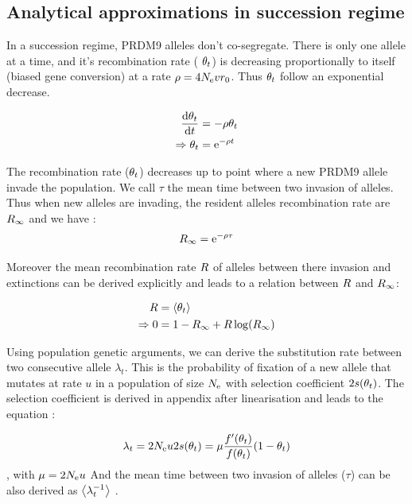 \documentclass{article}
\begin{document}
\subsection*{Analytical approximations in succession regime} 

In a succession regime, PRDM9 alleles don't co-segregate. There is only one allele at a time, and it's recombination rate ( $\theta_{t}$) is decreasing proportionally to itself (biased gene conversion) at a rate $\rho = 4 N_\mathrm{e} v r_0$. Thus $\theta_{t}$ follow an exponential decrease.

\begin{align} 
   \dfrac{\mathrm{d} \theta_{t}}{\mathrm{d} t}  &=  - \rho \theta_{t} \\
        \Rightarrow \theta_{t} &= \operatorname{e}^{-\rho t}
\end{align}

The recombination rate  ($\theta_{t}$) decreases up to point where a new PRDM9 allele invade the population. We call $\tau$ the mean time between two invasion of alleles. Thus when new alleles are invading, the resident alleles recombination rate are ${R_{\infty}}$ and we have :
\begin{equation}
   {R_{\infty}} =  \operatorname{e}^{-\rho \tau}
\end{equation}

Moreover the mean recombination rate $R$ of alleles between there invasion and extinctions can be derived explicitly and leads to a relation between $R$ and ${R_{\infty}}$: 

\begin{align} 
	R &= \left< \theta_{t} \right> \\
	\Rightarrow 0 &=  1-{R_{\infty}}  + R  \operatorname{log}({R_{\infty}} ) 
\end{align}

Using population genetic arguments, we can derive the substitution rate between two consecutive allele $\lambda_t$. This is the probability of fixation of a new allele that mutates at rate $u$ in a population of size $N_\mathrm{e}$ with selection coefficient $ 2 s(\theta_{t}) $. The selection coefficient is derived in appendix after linearisation and leads to the equation : 

\begin{equation}
 \lambda_t = 2 N_\mathrm{e} u 2 s(\theta_{t}) = \mu \dfrac{f'(\theta_{t})}{f(\theta_{t} )} (1 - \theta_{t} ) 
\end{equation}
, with $\mu = 2 N_\mathrm{e} u $ 
And the mean time between two invasion of alleles ($\tau$) can be also derived as $\left< \lambda_t^{-1} \right>$  .
\end{document}
